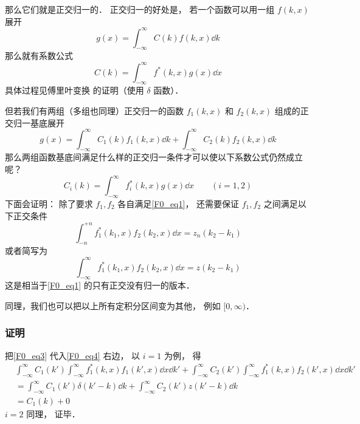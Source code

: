 那么它们就是正交归一的． 正交归一的好处是， 若一个函数可以用一组 $f(k, x)$ 展开
\begin{equation}
g(x) = \int_{-\infty}^{\infty} C(k) f(k, x) \dd{k}
\end{equation}
那么就有系数公式
\begin{equation}
C(k) = \int_{-\infty}^{\infty} f^*(k, x)g(x)\dd{x}
\end{equation}
具体过程见傅里叶变换 的证明（使用 $\delta$ 函数）．

但若我们有两组（多组也同理）正交归一的函数 $f_1(k, x)$ 和 $f_2(k, x)$ 组成的正交归一基底展开
\begin{equation}\label{F0_eq3}
g(x) = \int_{-\infty}^{\infty} C_1(k) f_1(k, x) \dd{k} + \int_{-\infty}^{\infty} C_2(k) f_2(k, x) \dd{k}
\end{equation}
那么两组函数基底间满足什么样的正交归一条件才可以使以下系数公式仍然成立呢？
\begin{equation}\label{F0_eq4}
C_i(k) = \int_{-\infty}^{\infty} f_i^*(k, x)g(x)\dd{x} \qquad (i = 1,2)
\end{equation}
下面会证明： 除了要求 $f_1, f_2$ 各自满足\autoref{F0_eq1}， 还需要保证 $f_1, f_2$ 之间满足以下正交条件
\begin{equation}
\int_{-n}^{+n} f_1^*(k_1, x) f_2(k_2, x) \dd{x} = z_n(k_2 - k_1)
\end{equation}
或者简写为
\begin{equation}
\int_{-\infty}^{\infty} f_1^*(k_1, x) f_2(k_2, x) \dd{x} = z(k_2 - k_1)
\end{equation}
这是相当于\autoref{F0_eq1} 的只有正交没有归一的版本．

同理，我们也可以把以上所有定积分区间变为其他， 例如 $[0, \infty)$．

\subsubsection{证明}
把\autoref{F0_eq3} 代入\autoref{F0_eq4} 右边， 以 $i = 1$ 为例， 得
\begin{equation}
\begin{aligned}
&\int_{-\infty}^{\infty} C_1(k') \int_{-\infty}^{\infty} f_1^*(k, x) f_1(k', x)\dd{x} \dd{k'} + \int_{-\infty}^{\infty} C_2(k') \int_{-\infty}^{\infty} f_1^*(k, x)f_2(k', x)\dd{x} \dd{k'}\\
&= \int_{-\infty}^{\infty} C_1(k') \delta(k' - k) \dd{k} + \int_{-\infty}^{\infty} C_2(k') z(k' - k) \dd{k}\\
&= C_1(k) + 0
\end{aligned}
\end{equation}
$i = 2$ 同理， 证毕．

